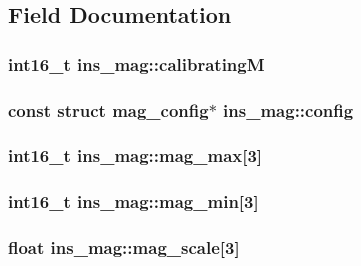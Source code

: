 \subsection{Field Documentation}
\hypertarget{structins__mag_afb144e5971a501b9b6b41cf12375afe1}{
\subsubsection[{calibrating\+M}]{\setlength{\rightskip}{0pt plus 5cm}int16\+\_\+t ins\+\_\+mag\+::calibrating\+M}}\label{structins__mag_afb144e5971a501b9b6b41cf12375afe1}
\hypertarget{structins__mag_a91fc5d77d0d1951b01074a2a7cbed73d}{
\subsubsection[{config}]{\setlength{\rightskip}{0pt plus 5cm}const struct {\bf mag\+\_\+config}$\ast$ ins\+\_\+mag\+::config}}\label{structins__mag_a91fc5d77d0d1951b01074a2a7cbed73d}
\hypertarget{structins__mag_aefcecc497e66a7ec14d0b00dba2d6b3f}{
\subsubsection[{mag\+\_\+max}]{\setlength{\rightskip}{0pt plus 5cm}int16\+\_\+t ins\+\_\+mag\+::mag\+\_\+max\mbox{[}3\mbox{]}}}\label{structins__mag_aefcecc497e66a7ec14d0b00dba2d6b3f}
\hypertarget{structins__mag_a3c2f0607c799ae0f50e7c044c623767f}{
\subsubsection[{mag\+\_\+min}]{\setlength{\rightskip}{0pt plus 5cm}int16\+\_\+t ins\+\_\+mag\+::mag\+\_\+min\mbox{[}3\mbox{]}}}\label{structins__mag_a3c2f0607c799ae0f50e7c044c623767f}
\hypertarget{structins__mag_a6b46204e31f42f6416fbd5ed6f81354b}{
\subsubsection[{mag\+\_\+scale}]{\setlength{\rightskip}{0pt plus 5cm}float ins\+\_\+mag\+::mag\+\_\+scale\mbox{[}3\mbox{]}}}\label{structins__mag_a6b46204e31f42f6416fbd5ed6f81354b}
